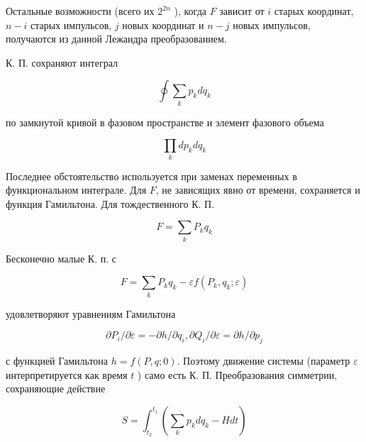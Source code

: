 \documentclass[10pt]{article}
\begin{document}
Остальные возможности (всего их $2^{2 n}$ ), когда $F$ зависит от $i$ старых координат, $n-i$ старых импульсов, $j$ новых координат и $n-j$ новых импульсов, получаются из данной Лежандра преобразованием.



К. П. сохраняют интеграл



\[

\oint \sum_{k} p_{k} d q_{k}

\]



по замкнутой кривой в фазовом пространстве и элемент фазового объема



\[

\prod_{k} d p_{k} d q_{k}

\]



Последнее обстоятельство используется при заменах переменных в функциональном интеграле. Для $F$, не зависящих явно от времени, сохраняется и функция Гамильтона. Для тождественного К. П.



\[

F=\sum_{k} P_{k} q_{k}

\]



Бесконечно малые К. п. с



\[

F=\sum_{k} P_{k} q_{k}-\varepsilon f\left(P_{k}, q_{k} ; \varepsilon\right)

\]



удовлетворяют уравнениям Гамильтона



\[

\partial P_{i} / \partial \varepsilon=-\partial h / \partial q_{i}, \partial Q_{i} / \partial \varepsilon=\partial h / \partial p_{j}

\]



с функцией Гамильтона $h=f(P, q ; 0)$. Поэтому движение системы (параметр $\varepsilon$ интерпретируется как время $t$ ) само есть К. П. Преобразования симметрии, сохраняющие действие



\[

S=\int_{t_{2}}^{t_{1}}\left(\sum_{k} p_{k} d q_{k}-H d t\right)

\]
\end{document}
